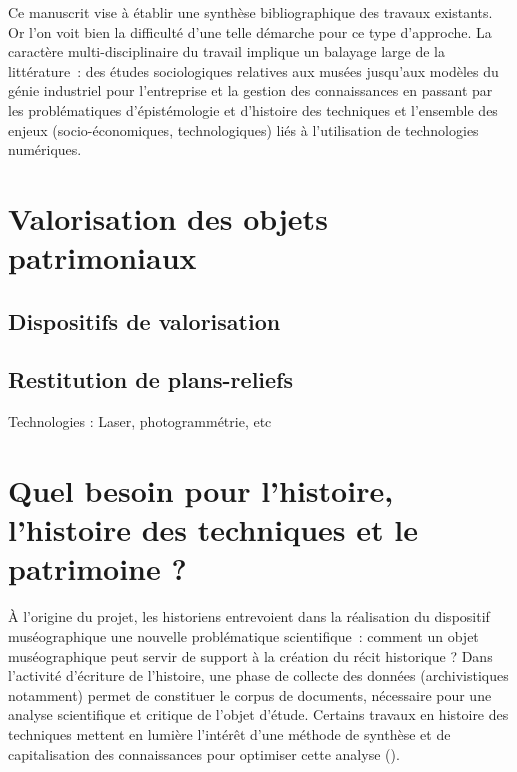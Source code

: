 \documentclass[a4paper,11pt,french]{article}
\begin{document}
Ce manuscrit vise à établir une synthèse bibliographique des travaux existants. Or l'on voit bien la difficulté d'une telle démarche pour ce type d'approche. La caractère multi-disciplinaire du travail implique un balayage large de la littérature~: des études sociologiques relatives aux musées jusqu'aux modèles du génie industriel pour l'entreprise et la gestion des connaissances en passant par les problématiques d'épistémologie et d'histoire des techniques et l'ensemble des enjeux (socio-économiques, technologiques) liés à l'utilisation de technologies numériques.

\section{Valorisation des objets patrimoniaux}

\subsection{Dispositifs de valorisation}

\subsection{Restitution de plans-reliefs}
Technologies : Laser, photogrammétrie, etc

\section{Quel besoin pour l'histoire, l'histoire des techniques et le patrimoine ?}

À l'origine du projet, les historiens entrevoient dans la réalisation du dispositif muséographique une nouvelle problématique scientifique~: comment un objet muséographique peut servir de support à la création du récit historique ?
Dans l'activité d'écriture de l'histoire, une phase de collecte des données (archivistiques notamment) permet de constituer le corpus de documents, nécessaire pour une analyse scientifique et critique de l'objet d'étude. Certains travaux en histoire des techniques mettent en lumière l'intérêt d'une méthode de synthèse et de capitalisation des connaissances pour optimiser cette analyse ().
\end{document}
